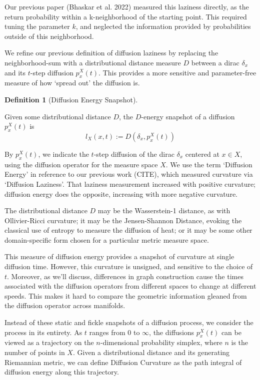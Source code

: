 \documentclass[
  letterpaper,
  DIV=11,
  numbers=noendperiod]{scrartcl}
\theoremstyle{plain}
\theoremstyle{definition}
\theoremstyle{plain}
\theoremstyle{definition}
\newtheorem{definition}{Definition}[section]
\theoremstyle{plain}
\theoremstyle{remark}
\begin{document}
Our previous paper (Bhaskar et al. 2022) measured this laziness
directly, as the return probability within a k-neighborhood of the
starting point. This required tuning the parameter \(k\), and neglected
the information provided by probabilities outside of this neighborhood.

We refine our previous definition of diffusion laziness by replacing the
neighborhood-sum with a distributional distance measure \(D\) between a
dirac \(\delta_{x}\) and its \(t\)-step diffusion \(p_{x}^X(t)\). This
provides a more sensitive and parameter-free measure of how `spread out'
the diffusion is.

\begin{definition}[Diffusion Energy
Snapshot]\protect\hypertarget{def-energy-of-diffusion}{}\label{def-energy-of-diffusion}

Given some distributional distance \(D\), the \(D\)-energy snapshot of a
diffusion \(p_{x}^X(t)\) is \[
l_{X}(x,t) := D\left(\delta_x, p_x^X(t)\right)
\]

\end{definition}

By \(p_{x}^X(t)\), we indicate the \(t\)-step diffusion of the dirac
\(\delta_{x}\) centered at \(x \in X\), using the diffusion operator for
the measure space \(X\). We use the term `Diffusion Energy' in reference
to our previous work (CITE), which measured curvature via `Diffusion
Laziness'. That laziness measurement increased with positive curvature;
diffusion energy does the opposite, increasing with more negative
curvature.

The distributional distance \(D\) may be the Wasserstein-1 distance, as
with Ollivier-Ricci curvature; it may be the Jensen-Shannon Distance,
evoking the classical use of entropy to measure the diffusion of heat;
or it may be some other domain-specific form chosen for a particular
metric measure space.

This measure of diffusion energy provides a snapshot of curvature at
single diffusion time. However, this curvature is unsigned, and
sensitive to the choice of \(t\). Moreover, as we'll discuss,
differences in graph construction cause the times associated with the
diffusion operators from different spaces to change at different speeds.
This makes it hard to compare the geometric information gleaned from the
diffusion operator across manifolds.

Instead of these static and fickle snapshots of a diffusion process, we
consider the process in its entirety. As \(t\) ranges from 0 to
\(\infty\), the diffusions \(p_{x}^X(t)\) can be viewed as a trajectory
on the \(n\)-dimensional probability simplex, where \(n\) is the number
of points in \(X\). Given a distributional distance and its generating
Riemannian metric, we can define Diffusion Curvature as the path
integral of diffusion energy along this trajectory.
\end{document}

